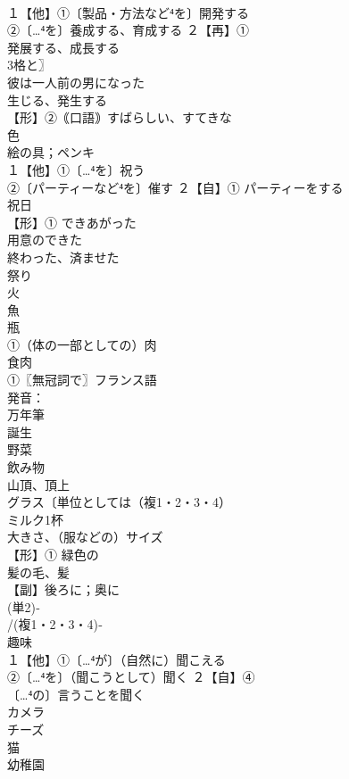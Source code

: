 \documentclass[8pt]{extreport}
\begin{document}
\begin{CJK}{UTF8}{min}
\\	１【他】①〔製品・方法など⁴を〕開発する 
\\	②〔…⁴を〕養成する、育成する ２【再】①
\\	発展する、成長する 
\\	3格と〗
\\	彼は一人前の男になった 
\\	生じる、発生する
\\	【形】②｟口語｠すばらしい、すてきな
\\	色
\\	絵の具；ペンキ
\\	１【他】①〔…⁴を〕祝う 
\\	②〔パーティーなど⁴を〕催す ２【自】① パーティーをする
\\	祝日 
\\	【形】① できあがった　
\\	用意のできた　
\\	終わった、済ませた
\\	祭り
\\	火 
\\	魚 
\\	瓶 
\\	①（体の一部としての）肉 
\\	食肉
\\	①〖無冠詞で〗フランス語 
\\	発音：
\\	万年筆 
\\	誕生 
\\	野菜 
\\	飲み物 
\\	山頂、頂上 
\\	グラス〔単位としては（複1・2・3・4）
\\	ミルク1杯
\\	大きさ、（服などの）サイズ
\\	【形】① 緑色の 
\\	髪の毛、髪 
\\	【副】後ろに；奥に
\\	(単2)‐
\\	/(複1・2・3・4)‐
\\	趣味
\\	１【他】①〔…⁴が〕（自然に）聞こえる 
\\	②〔…⁴を〕（聞こうとして）聞く ２【自】④
\\	〔…⁴の〕言うことを聞く
\\	カメラ 
\\	チーズ
\\	猫
\\	幼稚園

\end{CJK}
\end{document}

